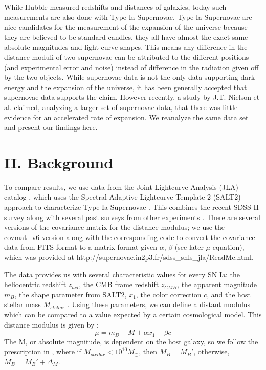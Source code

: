 \documentclass[aps,prl,reprint]{revtex4-1}
\begin{document}
While Hubble measured redshifts and distances of galaxies, today such measurements are also done with Type Ia Supernovae. Type Ia Supernovae are nice candidates for the measurement of the expansion of the universe because they are believed to be standard candles, they all have almost the exact same absolute magnitudes and light curve shapes. This means any difference in the distance moduli of two supernovae can be attributed to the different positions (and experimental error and noise) instead of difference in the radiation given off by the two objects. While supernovae data is not the only data supporting dark energy and the expansion of the universe, it has been generally accepted that supernovae data supports the claim. However recently, a study by J.T. Nielson et al. \cite{shocker} claimed, analyzing a larger set of supernovae data, that there was little evidence for an accelerated rate of expansion. We reanalyze the same data set and present our findings here.
\section{II. Background}
To compare results, we use data from the Joint Lightcurve Analysis (JLA) catalog \cite{sdss}, which uses the Spectral Adaptive Lightcurve Template 2 (SALT2) approach to characterize Type Ia Supernovae \cite{salt2}. This combines the recent SDSS-II survey along with several past surveys from other experiments \cite{sdss}. There are several versions of the covariance matrix for the distance modulus; we use the covmat\_v6 version along with the corresponding code to convert the covariance data from FITS format \cite{fits} to a matrix format given $\alpha$, $\beta$ (see later $\mu$ equation), which was provided at http://supernovae.in2p3.fr/sdss\_snls\_jla/ReadMe.html. 
\par The data provides us with several characteristic values for every SN Ia: the heliocentric redshift $z_{hel}$, the CMB frame redshift $z_{CMB}$, the apparent magnitude $m_B$, the shape parameter from SALT2, $x_1$, the color correction $c$, and the host stellar mass $M_{stellar}$ \cite{sdss}. Using these parameters, we can define a distant modulus which can be compared to a value expected by a certain cosmological model. This distance modulus is given by \cite{sdss}: 
\begin{equation}
\mu = m_B - M + \alpha x_1 - \beta c
\end{equation}
The M, or absolute magnitude, is dependent on the host galaxy, so we follow the prescription in \cite{sdss}, where if $M_{stellar} < 10^{10} M_{\odot}$, then $M_B = M_B'$, otherwise, $M_B = M_B' + \Delta_M$. 
\end{document}
